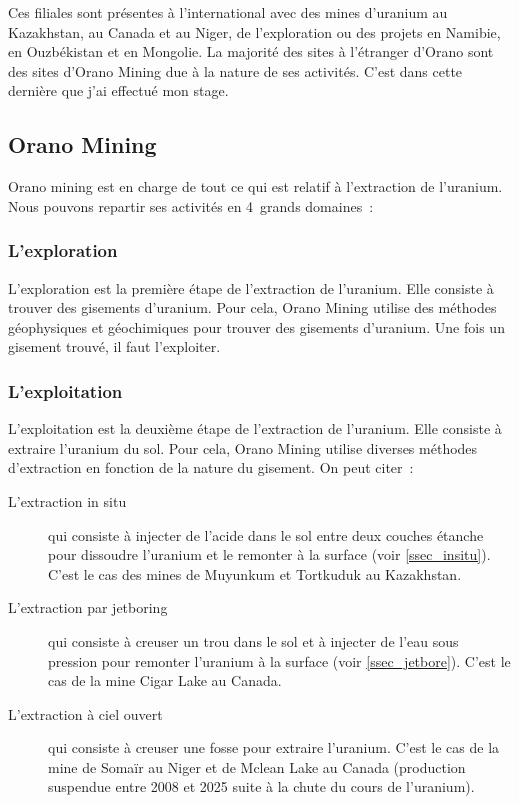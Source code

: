 Ces filiales sont présentes à l'international avec des mines d'uranium au Kazakhstan, au Canada et au Niger, de l'exploration ou des projets en Namibie, en Ouzbékistan et en Mongolie. La majorité des sites à l'étranger d'Orano sont des sites d'Orano Mining due à la nature de ses activités. C'est dans cette dernière que j'ai effectué mon stage.
\subsection{Orano Mining}

Orano mining est en charge de tout ce qui est relatif à l'extraction de l'uranium. Nous pouvons repartir ses activités en 4~grands domaines~:
\subsubsection{L'exploration}
L'exploration est la première étape de l'extraction de l'uranium. Elle consiste à trouver des gisements d'uranium. Pour cela, Orano Mining utilise des méthodes géophysiques et géochimiques pour trouver des gisements d'uranium. Une fois un gisement trouvé, il faut l'exploiter.

\subsubsection{L'exploitation}
L'exploitation est la deuxième étape de l'extraction de l'uranium. Elle consiste à extraire l'uranium du sol. Pour cela, Orano Mining utilise diverses méthodes d'extraction en fonction de la nature du gisement. On peut citer~:
\begin{description}
\item [L'extraction in situ] qui consiste à injecter de l'acide dans le sol entre deux couches étanche pour dissoudre l'uranium et le remonter à la surface (voir \cref{ssec_insitu}). C'est le cas des mines de Muyunkum et Tortkuduk au Kazakhstan.
\item [L'extraction par jetboring]qui consiste à creuser un trou dans le sol et à injecter de l'eau sous pression pour remonter l'uranium à la surface (voir \cref{ssec_jetbore}). C'est le cas de la mine Cigar Lake au Canada.
\item [L'extraction à ciel ouvert]qui consiste à creuser une fosse pour extraire l'uranium. C'est le cas de la mine de Somaïr au Niger et de Mclean Lake au Canada (production suspendue entre 2008 et 2025 suite à la chute du cours de l'uranium).
\end{description}

